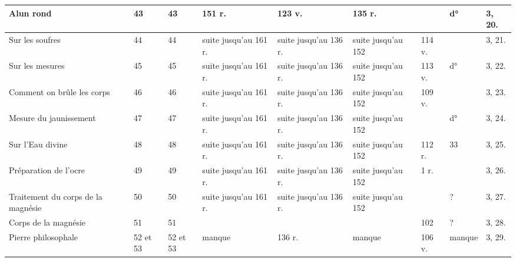 \documentclass[a4paper, 11pt, oneside, polutonikogreek, french]{article}
\begin{document}
\begin{center}
\begin{longtable}{|p{20mm}|p{11mm}|p{11mm}|p{11mm}|p{11mm}|p{11mm}|p{11mm}|p{11mm}|p{15mm}|}
        Alun rond & 43 & 43 & 151 r. & 123 v. & 135 r. & ~ & d° & 3, 20. \\ \hline
        Sur les soufres & 44 & 44 & suite jusqu'au 161 r. & suite jusqu'au 136 r. & suite jusqu'au 152 & 114 v. & ~ & 3, 21. \\ \hline
        Sur les mesures & 45 & 45 & suite jusqu'au 161 r. & suite jusqu'au 136 r. & suite jusqu'au 152 & 113 v. & d° & 3, 22. \\ \hline
        Comment on brûle les corps & 46 & 46 & suite jusqu'au 161 r. & suite jusqu'au 136 r. & suite jusqu'au 152 & 109 v. & ~ & 3, 23. \\ \hline
        Mesure du jaunissement & 47 & 47 & suite jusqu'au 161 r. & suite jusqu'au 136 r. & suite jusqu'au 152 & ~ & d° & 3, 24. \\ \hline
        Sur l'Eau divine & 48 & 48 & suite jusqu'au 161 r. & suite jusqu'au 136 r. & suite jusqu'au 152 & 112 r. & 33 & 3, 25. \\ \hline
        Préparation de l'ocre & 49 & 49 & suite jusqu'au 161 r. & suite jusqu'au 136 r. & suite jusqu'au 152 & 1 r. & ~ & 3, 26. \\ \hline
        Traitement du corps de la magnésie & 50 & 50 & suite jusqu'au 161 r. & suite jusqu'au 136 r. & suite jusqu'au 152 & ~ & ? & 3, 27. \\ \hline
        Corps de la magnésie & 51 & 51 & ~ & ~ & ~ & 102 & ? & 3, 28. \\ \hline
        Pierre philosophale & 52 et 53 & 52 et 53 & manque & 136 r. & manque & 106 v. & manque & 3, 29. \\ \hline
    \end{longtable}
\end{center}
\end{document}
